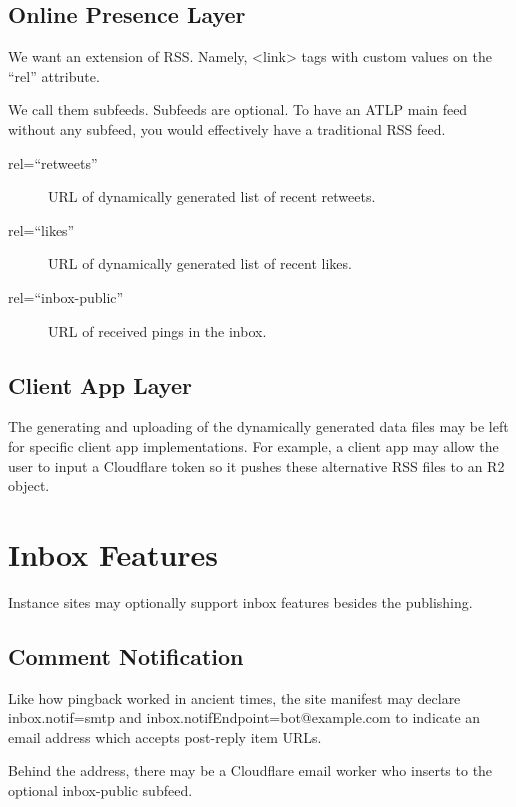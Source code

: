 \documentclass[a4paper,11pt]{article}
\begin{document}
\subsection{Online Presence Layer}
We want an extension of RSS. Namely, <link> tags with custom values on the ``rel'' attribute.

We call them subfeeds. Subfeeds are optional.
To have an ATLP main feed without any subfeed, you would effectively have a traditional RSS feed.

\begin{description}
    \item[rel=``retweets''] URL of dynamically generated list of recent retweets.
    \item[rel=``likes''] URL of dynamically generated list of recent likes.
    \item[rel=``inbox-public''] URL of received pings in the inbox.
\end{description}


\subsection{Client App Layer}

The generating and uploading of the dynamically generated data files may be left for specific client app implementations.
For example, a client app may allow the user to input a Cloudflare token so it pushes these alternative RSS files to an R2 object.


\section{Inbox Features}
Instance sites may optionally support inbox features besides the publishing.

\subsection{Comment Notification}
Like how pingback worked in ancient times,
the site manifest may declare inbox.notif=smtp and inbox.notifEndpoint=bot@example.com
to indicate an email address which accepts post-reply item URLs.

Behind the address, there may be a Cloudflare email worker who inserts to the optional inbox-public subfeed.
\end{document}
